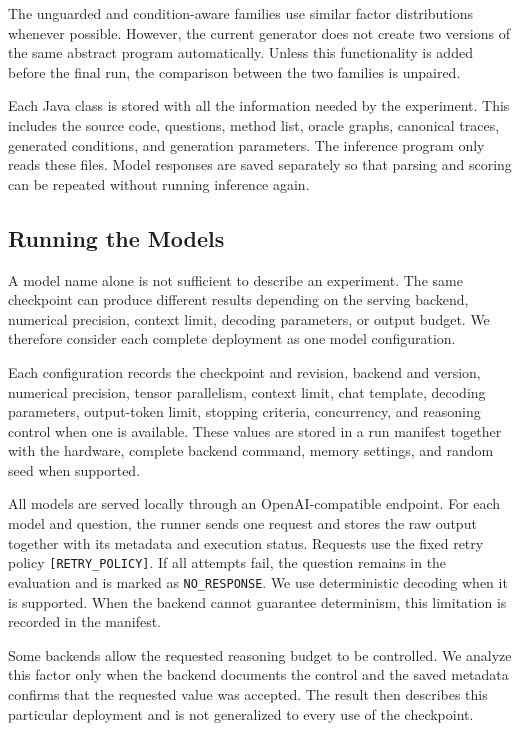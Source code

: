 The unguarded and condition-aware families use similar factor distributions whenever possible. However, the current generator does not create two versions of the same abstract program automatically. Unless this functionality is added before the final run, the comparison between the two families is unpaired.



Each Java class is stored with all the information needed by the experiment. This includes the source code, questions, method list, oracle graphs, canonical traces, generated conditions, and generation parameters. The inference program only reads these files. Model responses are saved separately so that parsing and scoring can be repeated without running inference again.

\subsection{Running the Models}
\label{subsec:model-configurations}

A model name alone is not sufficient to describe an experiment. The same checkpoint can produce different results depending on the serving backend, numerical precision, context limit, decoding parameters, or output budget. We therefore consider each complete deployment as one model configuration.



Each configuration records the checkpoint and revision, backend and version, numerical precision, tensor parallelism, context limit, chat template, decoding parameters, output-token limit, stopping criteria, concurrency, and reasoning control when one is available. These values are stored in a run manifest together with the hardware, complete backend command, memory settings, and random seed when supported.

All models are served locally through an OpenAI-compatible endpoint. For each model and question, the runner sends one request and stores the raw output together with its metadata and execution status. Requests use the fixed retry policy \texttt{[RETRY\_POLICY]}. If all attempts fail, the question remains in the evaluation and is marked as \texttt{NO\_RESPONSE}. We use deterministic decoding when it is supported. When the backend cannot guarantee determinism, this limitation is recorded in the manifest.

Some backends allow the requested reasoning budget to be controlled. We analyze this factor only when the backend documents the control and the saved metadata confirms that the requested value was accepted. The result then describes this particular deployment and is not generalized to every use of the checkpoint.

